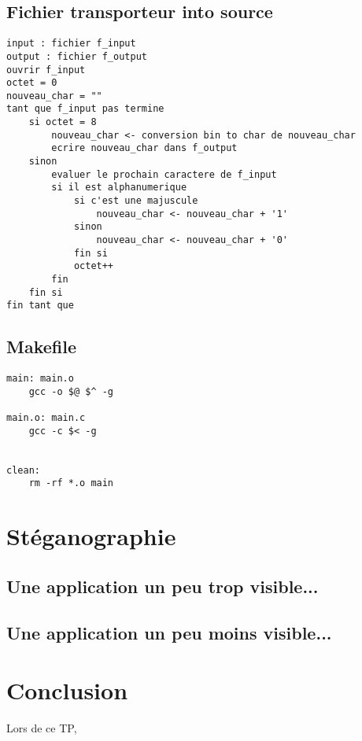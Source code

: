 \documentclass[12pt]{article}
\begin{document}
\subsection{Fichier transporteur into source}
\begin{lstlisting}[style=pseudoCodelarge, caption=Algorithme en français de ce processus]
input : fichier f_input
output : fichier f_output
ouvrir f_input
octet = 0
nouveau_char = ""
tant que f_input pas termine
    si octet = 8
        nouveau_char <- conversion bin to char de nouveau_char
        ecrire nouveau_char dans f_output
    sinon
        evaluer le prochain caractere de f_input
        si il est alphanumerique
            si c'est une majuscule
                nouveau_char <- nouveau_char + '1'
            sinon
                nouveau_char <- nouveau_char + '0'
            fin si
            octet++
        fin
    fin si
fin tant que
\end{lstlisting}

\subsection{Makefile} 
\begin{lstlisting}[style=Makefile, caption=Makefile du projet]
main: main.o
	gcc -o $@ $^ -g

main.o: main.c
	gcc -c $< -g


clean:
	rm -rf *.o main
\end{lstlisting} 

\section{Stéganographie}
\subsection{Une application un peu trop visible...}

\subsection{Une application un peu moins visible...}

\section{Conclusion}
Lors de ce TP, 
\end{document}
